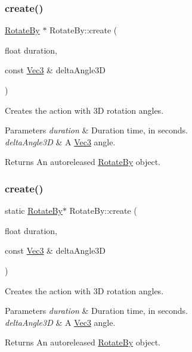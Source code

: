 \subsubsection{\texorpdfstring{create()}{create()}\hspace{0.1cm}{\footnotesize\ttfamily [5/6]}}
{\footnotesize\ttfamily \hyperlink{classRotateBy}{Rotate\+By} $\ast$ Rotate\+By\+::create (\begin{DoxyParamCaption}\item[{float}]{duration,  }\item[{const \hyperlink{classVec3}{Vec3} \&}]{delta\+Angle3D }\end{DoxyParamCaption})\hspace{0.3cm}{\ttfamily [static]}}

Creates the action with 3D rotation angles.


\begin{DoxyParams}{Parameters}
{\em duration} & Duration time, in seconds. \\
\hline
{\em delta\+Angle3D} & A \hyperlink{classVec3}{Vec3} angle. \\
\hline
\end{DoxyParams}
\begin{DoxyReturn}{Returns}
An autoreleased \hyperlink{classRotateBy}{Rotate\+By} object. 
\end{DoxyReturn}
\mbox{\label{classRotateBy_a45070cbbc950f9ce732571d558d0e916}} 
\subsubsection{\texorpdfstring{create()}{create()}\hspace{0.1cm}{\footnotesize\ttfamily [6/6]}}
{\footnotesize\ttfamily static \hyperlink{classRotateBy}{Rotate\+By}$\ast$ Rotate\+By\+::create (\begin{DoxyParamCaption}\item[{float}]{duration,  }\item[{const \hyperlink{classVec3}{Vec3} \&}]{delta\+Angle3D }\end{DoxyParamCaption})\hspace{0.3cm}{\ttfamily [static]}}

Creates the action with 3D rotation angles.


\begin{DoxyParams}{Parameters}
{\em duration} & Duration time, in seconds. \\
\hline
{\em delta\+Angle3D} & A \hyperlink{classVec3}{Vec3} angle. \\
\hline
\end{DoxyParams}
\begin{DoxyReturn}{Returns}
An autoreleased \hyperlink{classRotateBy}{Rotate\+By} object. 
\end{DoxyReturn}
\mbox{\label{classRotateBy_a48df6f744dd4d505b2b78cbe599b8724}} 

